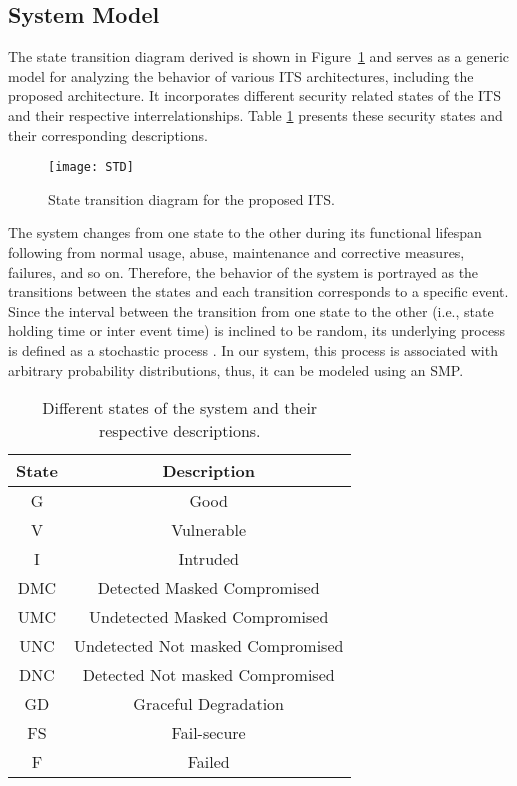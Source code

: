 \documentclass[preprint,number,12pt]{elsarticle}
\begin{document}
\subsection {System Model}
The state transition diagram derived is shown in Figure~\ref{fig:STD} and serves as a generic model for analyzing the behavior of various ITS architectures, including the proposed architecture. It incorporates different security related states of the ITS and their respective interrelationships. Table
\ref{table: state descriptions} presents these security states and their corresponding descriptions.
\begin{figure}[!t]
\centering
\texttt{[image: STD]}
\caption{State transition diagram for the proposed ITS.}
\label{fig:STD}
\end{figure}
The system changes from one state to the other during its functional lifespan following from normal usage, abuse, maintenance and corrective measures, failures, and so on. Therefore, the behavior of the system is portrayed as the transitions between the states and each transition corresponds to a specific event. Since the interval between the transition from one state to the other (i.e., state holding time or inter event time) is inclined to be random, its underlying process is defined as a stochastic process \citep{Helvik2008209}. In our system, this process is associated with arbitrary probability distributions, thus, it can be modeled using an SMP.
\begin{table}
\renewcommand{\arraystretch}{1.3}
\caption{Different states of the system and their respective descriptions.}
\label{table: state descriptions}
\centering
\begin{tabular}{c||c}
\hline
\bfseries State & \bfseries Description \\
\hline\hline
G & Good  \\
\hline\hline
V & Vulnerable \\
\hline\hline
I & Intruded \\
\hline\hline
DMC & Detected Masked Compromised \\
\hline\hline
UMC &Undetected Masked Compromised \\
\hline\hline
UNC & Undetected Not masked Compromised \\
\hline\hline
DNC &Detected Not masked Compromised \\
\hline\hline
GD& Graceful Degradation\\
\hline\hline
FS& Fail-secure\\
\hline\hline
F& Failed\\
\hline
\end{tabular}
\end{table}
\end{document}
